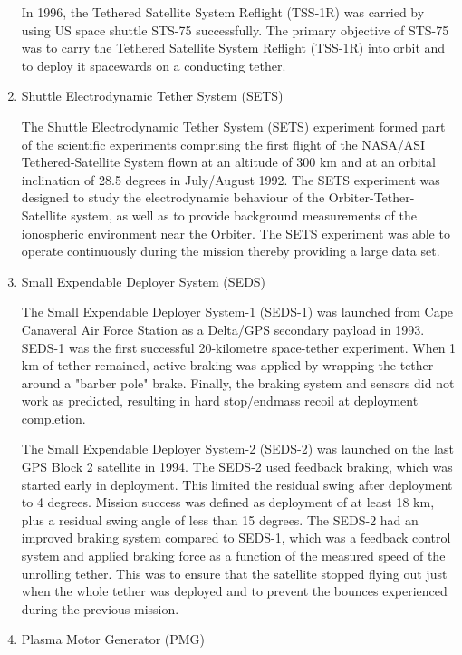 \begin{enumerate}
\begin{enumerate}
\end{enumerate}

In 1996, the Tethered Satellite System Reflight (TSS-1R) was carried by using US space shuttle STS-75 successfully. The primary objective of STS-75 was to carry the Tethered Satellite System Reflight (TSS-1R) into orbit and to deploy it spacewards on a conducting tether.
\item{Shuttle Electrodynamic Tether System (SETS)}

	The Shuttle Electrodynamic Tether System (SETS) experiment formed part of the scientific experiments comprising the first flight of the NASA/ASI Tethered-Satellite System flown at an altitude of 300 km and at an orbital inclination of 28.5 degrees in July/August 1992. The SETS experiment was designed to study the electrodynamic behaviour of the Orbiter-Tether-Satellite system, as well as to provide background measurements of the ionospheric environment near the Orbiter. The SETS experiment was able to operate continuously during the mission thereby providing a large data set.
\item{Small Expendable Deployer System (SEDS)}

The Small Expendable Deployer System-1 (SEDS-1) was launched from Cape Canaveral Air Force Station as a Delta/GPS secondary payload in 1993. SEDS-1 was the first successful 20-kilometre space-tether experiment. When 1 km of tether remained, active braking was applied by wrapping the tether around a "barber pole" brake. Finally, the braking system and sensors did not work as predicted, resulting in hard stop/endmass recoil at deployment completion.


The Small Expendable Deployer System-2 (SEDS-2) was launched on the last GPS Block 2 satellite in 1994. The SEDS-2 used feedback braking, which was started early in deployment. This limited the residual swing after deployment to 4 degrees. Mission success was defined as deployment of at least 18 km, plus a residual swing angle of less than 15 degrees. The SEDS-2 had an improved braking system compared to SEDS-1, which was a feedback control system and applied braking force as a function of the measured speed of the unrolling tether. This was to ensure that the satellite stopped flying out just when the whole tether was deployed and to prevent the bounces experienced during the previous mission.
\item{Plasma Motor Generator (PMG)}


\end{enumerate}
